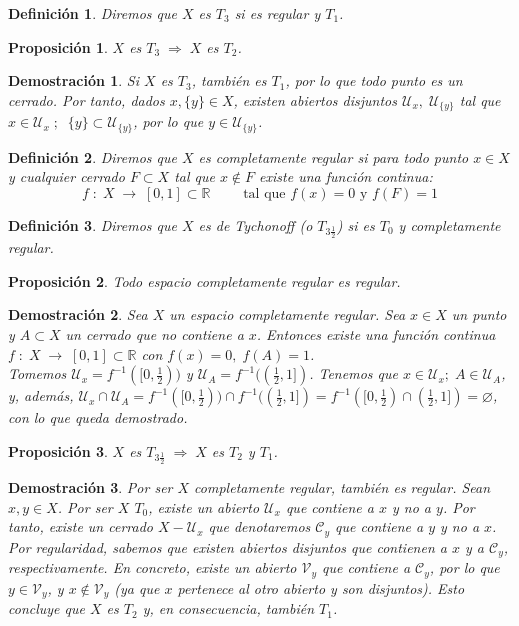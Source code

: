 \documentclass[12pt,twoside]{report}
\newcommand\mc[1]{\mathcal{#1}}
\theoremstyle{azul}
\newtheorem*{propx}{Proposición}
\newtheorem*{demx}{Demostración}
\newtheorem*{defix}{Definición}
\theoremstyle{azul2}
\theoremstyle{plain}
\theoremstyle{definition}
\theoremstyle{remark}
\begin{document}
\begin{defix}
Diremos que $X$ es $T_3$ si es regular y $T_1$.
\end{defix}

\begin{propx}
$X$ es $T_3 \; \Rightarrow \; X$ es $T_2$.
\end{propx}
\begin{demx}
Si $X$ es $T_3$, también es $T_1$, por lo que todo punto es un cerrado. Por tanto, dados $x, \{y\} \in X$, existen abiertos disjuntos $\mc{U}_x, \; \mc{U}_{\{y\}}$ tal que $x \in \mc{U}_x\; ; \;\; \{y\} \subset \mc{U}_{\{y\}}$, por lo que $y \in \mc{U}_{\{y\}}$.
\end{demx}

\begin{defix}
Diremos que $X$ es completamente regular si para todo punto $x \in X$ y cualquier cerrado $F \subset X$ tal que $x \not\in F$ existe una función continua:
$$f\;: \; X \; \rightarrow \; [0,1] \subset \mathbb{R}\qquad\text{ tal que }f(x) = 0\text{ y }f(F) = 1$$
\end{defix}

\begin{defix}
Diremos que $X$ es de Tychonoff (o $T_{3\frac{1}{2}}$) si es $T_0$ y completamente regular.
\end{defix}

\begin{propx}
Todo espacio completamente regular es regular.
\end{propx}
\begin{demx}
Sea $X$ un espacio completamente regular. Sea $x\in X$ un punto y $A \subset X$ un cerrado que no contiene a $x$. Entonces existe una función continua $f\;: \; X \; \longrightarrow \; [0,1] \subset \mathbb{R}$ con $f(x) = 0,\; f(A) = 1$.\\
Tomemos $\mc{U}_x = f^{-1}([0,\frac{1}{2}))$ y $\mc{U}_A = f^{-1}((\frac{1}{2},1])$. Tenemos que $x \in \mc{U}_x; \; A \in \mc{U}_A$, y, además, $\mc{U}_x \cap \mc{U}_A = f^{-1}([0,\frac{1}{2})) \cap f^{-1}((\frac{1}{2},1]) = f^{-1}([0,\frac{1}{2}) \cap (\frac{1}{2},1]) = \varnothing$, con lo que queda demostrado.
\end{demx}


\begin{propx}
$X$ es $T_{3\frac{1}{2}} \; \Rightarrow \; X$ es $T_2$ y $T_1$.
\end{propx}
\begin{demx}
Por ser $X$ completamente regular, también es regular. Sean $x, y \in X$. Por ser $X$ $T_0$, existe un abierto $\mc{U}_x$ que contiene a $x$ y no a $y$. Por tanto, existe un cerrado $X-\mc{U}_x$ que denotaremos $\mc{C}_y$ que contiene a $y$ y no a $x$. Por regularidad, sabemos que existen abiertos disjuntos que contienen a $x$ y a $\mc{C}_y$, respectivamente. En concreto, existe un abierto $\mc{V}_y$ que contiene a $\mc{C}_y$, por lo que $y \in \mc{V}_y$, y $x \not\in \mc{V}_y$ (ya que $x$ pertenece al otro abierto y son disjuntos). Esto concluye que $X$ es $T_2$ y, en consecuencia, también $T_1$.
\end{demx}
\end{document}
